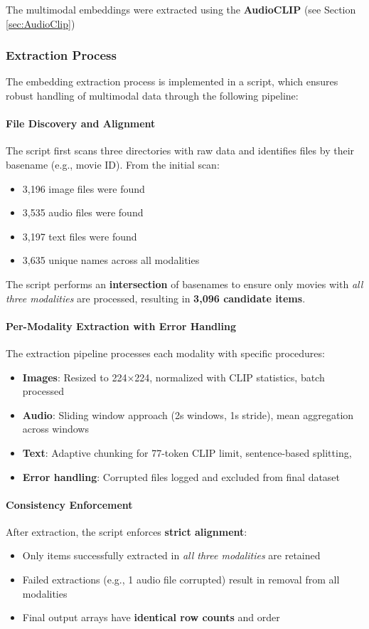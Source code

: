 The multimodal embeddings were extracted using the \textbf{AudioCLIP} (see Section \ref{sec:AudioClip}) 
\subsubsection{Extraction Process}

The embedding extraction process is implemented in a script, which ensures robust handling of multimodal data through the following pipeline:

\paragraph{File Discovery and Alignment}
The script first scans three directories with raw data and identifies files by their basename (e.g., movie ID). From the initial scan:
\begin{itemize}
    \item 3,196 image files were found
    \item 3,535 audio files were found
    \item 3,197 text files were found
    \item 3,635 unique names across all modalities
\end{itemize}

The script performs an \textbf{intersection} of basenames to ensure only movies with \textit{all three modalities} are processed, resulting in \textbf{3,096 candidate items}.

\paragraph{Per-Modality Extraction with Error Handling}
The extraction pipeline processes each modality with specific procedures:

\begin{itemize}
    \item \textbf{Images}: Resized to 224×224, normalized with CLIP statistics, batch processed
    \item \textbf{Audio}: Sliding window approach (2s windows, 1s stride), mean aggregation across windows
    \item \textbf{Text}: Adaptive chunking for 77-token CLIP limit, sentence-based splitting,
    \item \textbf{Error handling}: Corrupted files logged and excluded from final dataset
\end{itemize}

\paragraph{Consistency Enforcement}
After extraction, the script enforces \textbf{strict alignment}:
\begin{itemize}
    \item Only items successfully extracted in \textit{all three modalities} are retained
    \item Failed extractions (e.g., 1 audio file corrupted) result in removal from all modalities
    \item Final output arrays have \textbf{identical row counts} and order
\end{itemize}

